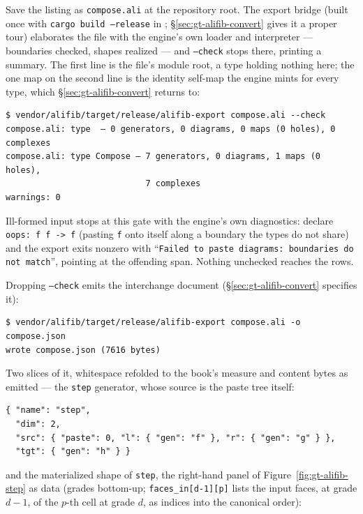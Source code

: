 Save the listing as \texttt{compose.ali} at the repository root. The
export bridge (built once with \texttt{cargo build --release} in
; \S\ref{sec:gt-alifib-convert} gives it a proper
tour) elaborates the file with the engine's own loader and interpreter
--- boundaries checked, shapes realized --- and \texttt{--check} stops
there, printing a summary. The first line is the file's module root, a
type holding nothing here; the one map on the second line is the
identity self-map the engine mints for every type, which
\S\ref{sec:gt-alifib-convert} returns to:

\begin{Verbatim}[fontsize=\small,frame=leftline,rulecolor=\color{accentmid},framesep=3mm,xleftmargin=3mm]
$ vendor/alifib/target/release/alifib-export compose.ali --check
compose.ali: type  — 0 generators, 0 diagrams, 0 maps (0 holes), 0 complexes
compose.ali: type Compose — 7 generators, 0 diagrams, 1 maps (0 holes),
                            7 complexes
warnings: 0
\end{Verbatim}

\noindent Ill-formed input stops at this gate with the engine's own
diagnostics: declare \texttt{oops:\ f f -> f} (pasting \texttt{f}
onto itself along a boundary the types do not share) and the export
exits nonzero with ``\texttt{Failed to paste diagrams: boundaries do
not match}'', pointing at the offending span. Nothing unchecked
reaches the rows.

Dropping \texttt{--check} emits the interchange document
(\S\ref{sec:gt-alifib-convert} specifies it):

\begin{Verbatim}[fontsize=\small,frame=leftline,rulecolor=\color{accentmid},framesep=3mm,xleftmargin=3mm]
$ vendor/alifib/target/release/alifib-export compose.ali -o compose.json
wrote compose.json (7616 bytes)
\end{Verbatim}

\noindent Two slices of it, whitespace refolded to the book's measure
and content bytes as emitted --- the \texttt{step} generator, whose
source is the paste tree itself:

\begin{Verbatim}[fontsize=\small,frame=leftline,rulecolor=\color{accentmid},framesep=3mm,xleftmargin=3mm]
{ "name": "step",
  "dim": 2,
  "src": { "paste": 0, "l": { "gen": "f" }, "r": { "gen": "g" } },
  "tgt": { "gen": "h" } }
\end{Verbatim}

\noindent and the materialized shape of \texttt{step}, the right-hand
panel of Figure~\ref{fig:gt-alifib-step} as data (grades bottom-up;
\texttt{faces\_in[d-1][p]} lists the input faces, at grade $d{-}1$, of
the $p$-th cell at grade $d$, as indices into the canonical order):

